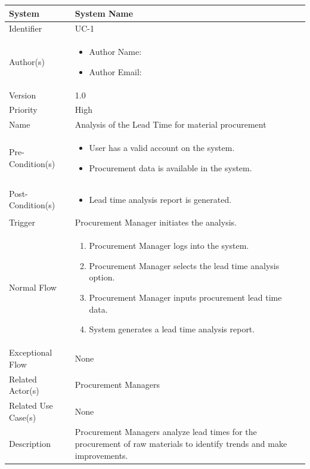 \begin{center}
	\begin{tabularx}{\textwidth}{|l|X|}
		\hline
		System & System Name \\
		\hline
		Identifier & UC-1 \\
		\hline
		Author(s) & \begin{itemize}[left=0pt]
			\item Author Name:
			\item Author Email:
		\end{itemize} \\
		\hline
		Version & 1.0 \\
		\hline
		Priority & High \\
		\hline
		Name & Analysis of the Lead Time for material procurement \\
		\hline
		Pre-Condition(s) &  \begin{itemize}[left=0pt]
			\item User has a valid account on the system.
			\item Procurement data is available in the system.
		\end{itemize} \\
		\hline
		Post-Condition(s) & \begin{itemize}[left=0pt]
			\item Lead time analysis report is generated.
		\end{itemize} \\
		\hline
		Trigger & Procurement Manager initiates the analysis. \\
		\hline
		Normal Flow & \begin{enumerate}[left=0pt]
			\item Procurement Manager logs into the system.
			\item Procurement Manager selects the lead time analysis option.
			\item Procurement Manager inputs procurement lead time data.
			\item System generates a lead time analysis report.
		\end{enumerate} \\
		\hline
		Exceptional Flow & None \\
		\hline
		Related Actor(s) & Procurement Managers \\
		\hline
		Related Use Case(s) & None \\
		\hline
		Description & Procurement Managers analyze lead times for the procurement of raw materials to identify trends and make improvements. \\
		\hline
	\end{tabularx}
\end{center}

